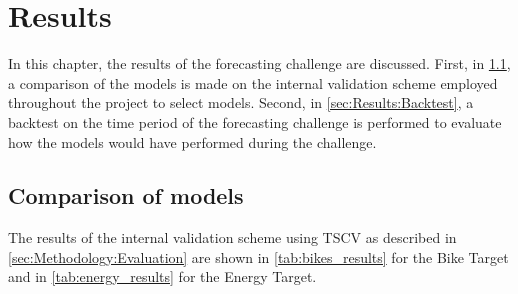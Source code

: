 \newpage
\section{Results}
\label{ch:Results}

In this chapter, the results of the forecasting challenge are discussed. First, in \cref{sec:Results:ComparisonModels}, a comparison of the models is made on the internal validation scheme employed throughout the project to select models. Second, in \cref{sec:Results:Backtest}, a backtest on the time period of the forecasting challenge is performed to evaluate how the models would have performed during the challenge.

\subsection{Comparison of models}
\label{sec:Results:ComparisonModels}

The results of the internal validation scheme using TSCV as described in \cref{sec:Methodology:Evaluation} are shown in \cref{tab:bikes_results} for the Bike Target and in \cref{tab:energy_results} for the Energy Target. 

\begin{table}[htp]
\centering
{}
\caption{Results of time series cross-validation on the Bike Target for the full year 2024 with weekly shifting of sliding windows. The best values are highlighted in bold. \textit{Pinball Loss} refers to the sum of the Pinball Losses for all quantile levels, averaged over the folds in the TSCV (cf. \cref{sec:Methodology:Evaluation})}
\label{tab:bikes_results}
\end{table}

